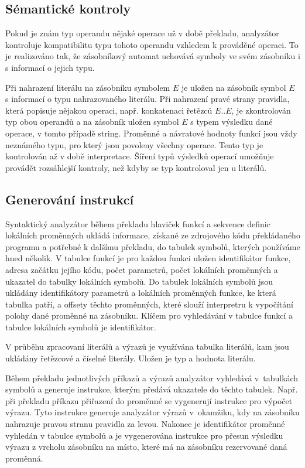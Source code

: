 \documentclass[a4paper,11pt,titlepage]{article}
\begin{document}




\subsection{Sémantické kontroly}
Pokud je znám typ operandu nějaké operace už v době překladu, analyzátor kontroluje kompatibilitu typu tohoto operandu vzhledem k prováděné operaci. To je realizováno tak, že zásobníkový automat uchovává symboly ve svém zásobníku i s informací o jejich typu.

Při nahrazení literálu na zásobníku symbolem $E$ je uložen na zásobník symbol $E$ s informací o typu nahrazovaného literálu.
Při nahrazení pravé strany pravidla, která popisuje nějakou operaci, např. konkatenaci řetězců $E .. E$, je zkontrolován typ obou operandů a na zásobník uložen symbol $E$ s typem výsledku dané operace, v tomto případě string. Proměnné a návratové hodnoty funkcí jsou vždy neznámého typu, pro který jsou povoleny všechny operace. Tento typ je kontrolován až v době interpretace. Šíření typů výsledků operací umožňuje provádět rozsáhlejší kontroly, než kdyby se typ kontroloval jen u literálů.

\subsection{Generování instrukcí}

Syntaktický analyzátor během překladu hlaviček funkcí a sekvence definic lo\-kál\-ních proměnných ukládá informace, získané ze zdrojového kódu pře\-klá\-da\-ného programu a potřebné k dalšímu překladu, do tabulek symbolů, kterých používáme hned několik. V tabulce funkcí je pro každou funkci uložen identifikátor funkce, adresa začátku jejího kódu, počet parametrů, počet lokálních pro\-měn\-ných a ukazatel do tabulky lokálních symbolů. Do tabulek lokálních symbolů jsou ukládány identifikátory parametrů a lokálních proměnných funkce, ke která tabulka patří, a offsety těchto proměnných, které slouží interpretru k vypočítání polohy dané proměnné na zásobníku. Klíčem pro vyhledávání v tabulce funkcí a tabulce lokálních symbolů je identifikátor.

V průběhu zpracovaní literálů a výrazů je využívána tabulka literálů, kam jsou ukládány řetězcové a číselné  literály. Uložen je typ a hodnota literálu.

Během překladu jednotlivých příkazů a výrazů analyzátor vyhledává v~tabulkách symbolů a generuje instrukce, kterým předává ukazatele do těchto tabulek. Např. při překladu příkazu přiřazení do proměnné se vygenerují instrukce pro výpočet výrazu. Tyto instrukce generuje analyzátor výrazů v~okamžiku, kdy na zásobníku nahrazuje pravou stranu pravidla za levou. Nakonec je identifikátor proměnné vyhledán v tabulce symbolů a je vygenerována instrukce pro přesun výsledku výrazu z vrcholu zásobníku na místo, které má na zásobníku rezervované daná proměnná.
\end{document}
